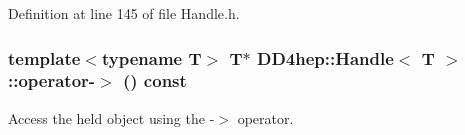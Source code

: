 Definition at line 145 of file Handle.h.\hypertarget{class_d_d4hep_1_1_handle_afb3984a2a89e50232d519c535818d74b}{
\subsubsection[{operator-\/$>$}]{\setlength{\rightskip}{0pt plus 5cm}template$<$typename T$>$ {\bf T}$\ast$ {\bf DD4hep::Handle}$<$ {\bf T} $>$::operator-\/$>$ () const}}
\label{class_d_d4hep_1_1_handle_afb3984a2a89e50232d519c535818d74b}


Access the held object using the -\/$>$ operator. 


